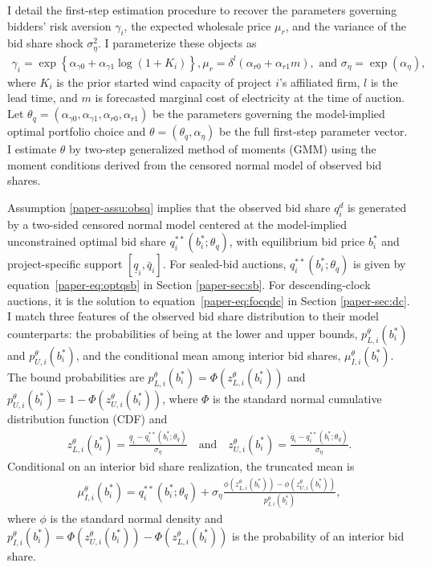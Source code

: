 \documentclass[12pt]{article}
\theoremstyle{definition} %
\begin{document}
I detail the first-step estimation procedure to recover the parameters governing bidders' risk aversion $\gamma_i$, the expected wholesale price $\mu_r$, and the variance of the bid share shock $\sigma_\eta^2$. I parameterize these objects as
\begin{align*}
\gamma_i = \exp\left\{\alpha_{\gamma 0}+\alpha_{\gamma 1}\log(1+K_i)\right\},
\mu_r = \delta^l(\alpha_{r 0}+\alpha_{r 1}m), \text{ and }
\sigma_\eta = \exp(\alpha_\eta),
\end{align*}
where $K_i$ is the prior started wind capacity of project $i$'s affiliated firm, $l$ is the lead time, and $m$ is forecasted marginal cost of electricity at the time of auction. Let $\theta_q=(\alpha_{\gamma 0},\alpha_{\gamma 1},\alpha_{r 0},\alpha_{r 1})$ be the parameters governing the model-implied optimal portfolio choice and $\theta=(\theta_q,\alpha_\eta)$ be the full first-step parameter vector. I estimate $\theta$ by two-step generalized method of moments (GMM) using the moment conditions derived from the censored normal model of observed bid shares.

Assumption \ref{paper-assu:obsq} implies that the observed bid share $q_i^d$ is generated by a two-sided censored normal model centered at the model-implied unconstrained optimal bid share $q_i^{\ast\ast}(b_i^\ast;\theta_q)$, with equilibrium bid price $b_i^\ast$ and project-specific support $[\underline{q}_i,\bar{q}_i]$. For sealed-bid auctions, $q_i^{\ast\ast}(b_i^\ast;\theta_q)$ is given by equation~\eqref{paper-eq:optqsb} in Section \ref{paper-sec:sb}. For descending-clock auctions, it is the solution to equation~\eqref{paper-eq:focqdc} in Section \ref{paper-sec:dc}. I match three features of the observed bid share distribution to their model counterparts: the probabilities of being at the lower and upper bounds, $p_{L,i}^\theta(b_i^\ast)$ and $p_{U,i}^\theta(b_i^\ast)$, and the conditional mean among interior bid shares, $\mu_{I,i}^\theta(b_i^\ast)$. The bound probabilities are $p_{L,i}^\theta(b_i^\ast)=\Phi(z_{L,i}^\theta(b_i^\ast))$ and $p_{U,i}^\theta(b_i^\ast)=1-\Phi(z_{U,i}^\theta(b_i^\ast))$, where $\Phi$ is the standard normal cumulative distribution function (CDF) and
\begin{align*}
z_{L,i}^\theta(b_i^\ast) = \frac{\underline{q}_i - q_i^{\ast\ast}(b_i^\ast; \theta_q)}{\sigma_\eta}
\quad \text{and} \quad
z_{U,i}^\theta(b_i^\ast) = \frac{\bar{q}_i - q_i^{\ast\ast}(b_i^\ast; \theta_q)}{\sigma_\eta}.
\end{align*}
Conditional on an interior bid share realization, the truncated mean is
\begin{align*}
\mu_{I,i}^\theta(b_i^\ast) = q_i^{\ast\ast}(b_i^\ast;\theta_q) + \sigma_\eta \frac{\phi(z_{L,i}^\theta(b_i^\ast))-\phi(z_{U,i}^\theta(b_i^\ast))}{p_{I,i}^\theta(b_i^\ast)},
\end{align*}
where $\phi$ is the standard normal density and $p_{I,i}^\theta(b_i^\ast) = \Phi(z_{U,i}^\theta(b_i^\ast)) - \Phi(z_{L,i}^\theta(b_i^\ast))$ is the probability of an interior bid share.
\end{document}
